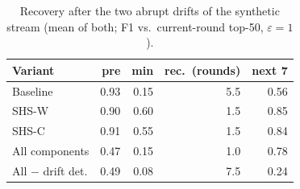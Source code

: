 \begin{table}[t]\centering\footnotesize
\caption{Recovery after the two abrupt drifts of the synthetic stream (mean of both; F1 vs.\ current-round top-50, $\varepsilon=1$).}\label{tab:drift}
\begin{tabular}{lrrrr}\toprule Variant & pre & min & rec.\ (rounds) & next 7\\\midrule
Baseline & 0.93 & 0.15 & 5.5 & 0.56\\
SHS-W & 0.90 & 0.60 & 1.5 & 0.85\\
SHS-C & 0.91 & 0.55 & 1.5 & 0.84\\
All components & 0.47 & 0.15 & 1.0 & 0.78\\
All $-$ drift det. & 0.49 & 0.08 & 7.5 & 0.24\\
\bottomrule\end{tabular}\end{table}